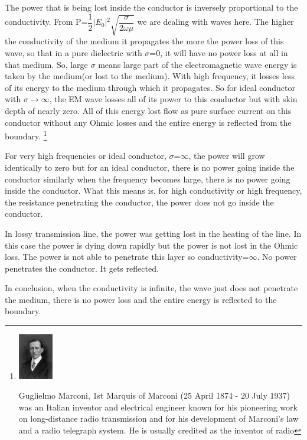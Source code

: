The power that is being lost inside the conductor is inversely proportional to the conductivity. From P=$\dfrac{1}{2}$$\lvert E_{0}\rvert$$^{2}$$\sqrt{\dfrac{\sigma}{2\omega\mu}}$ we are dealing with waves here. The higher the conductivity of the medium it propagates the more the power loss of this wave, so that in a pure dielectric with $\sigma$=0, it will have no power loss at all in that medium. So, large $\sigma$ means large part of the electromagnetic wave energy is taken by the medium(or lost to the medium). With high frequency, it  losses less of its energy to the medium through which it propagates. So for ideal conductor with $\sigma$$\longrightarrow$$\infty$, the EM wave losses all of its power to this conductor but with skin depth of nearly zero. All of this energy lost flow as pure surface current on this conductor without any Ohmic losses and the entire energy is reflected from the boundary.
\footnote{\includegraphics[height=20mm]{./graphics/footnotegm.jpg}

Guglielmo Marconi, 1st Marquis of Marconi (25 April 1874 - 20 July 1937) was an Italian inventor and electrical engineer known for his pioneering work on long-distance radio transmission and for his development of Marconi's law and a radio telegraph system. He is usually credited as the inventor of radio}

For very high frequencies or ideal conductor, $\sigma$=$\infty$, the power will grow identically to zero but for an ideal conductor, there is no power going inside the conductor similarly when the frequency becomes large, there is no power going inside the conductor. What this means is, for high conductivity or high frequency, the resistance penetrating the conductor, the power does not go inside the conductor.

In lossy transmission line, the power was getting lost in the heating of the line. In this case the power is dying down rapidly but the power is not lost in the Ohmic loss. The power is not able to penetrate this layer so conductivity=$\infty$. No power penetrates the conductor. It gets reflected.

In conclusion, when the conductivity is infinite, the wave just does not penetrate the medium, there is no power loss and the entire energy is reflected to the boundary.
